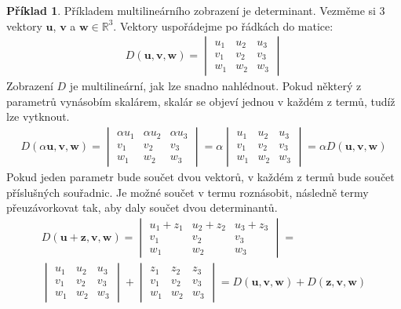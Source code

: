 \documentclass[a5paper,12pt]{amsbook}
\theoremstyle{definition}
\newtheorem{example}{Příklad}[chapter]
\newcommand{\myscalar}[1]{#1}
\newcommand{\myvec}[1]{\mathbf{#1}}
\newcommand{\myspace}[1]{\mathbb{#1}}
\begin{document}
\begin{example}
Příkladem multilineárního zobrazení je determinant. Vezměme si 3 vektory $\myvec{u}$, 
$\myvec{v}$ a $\myvec{w}\in\myspace{R}^3$. Vektory uspořádejme po řádkách do matice:
\begin{align*}
D(\myvec{u}, \myvec{v}, \myvec{w}) =
\begin{vmatrix}
u_1 & u_2 & u_3 \\
v_1 & v_2 & v_3 \\
w_1 & w_2 & w_3
\end{vmatrix}
\end{align*}
Zobrazení $D$ je multilineární, jak lze snadno nahlédnout. Pokud některý z parametrů
vynásobím skalárem, skalár se objeví jednou v každém z termů, tudíž lze vytknout.
\begin{align*}
D(\myscalar{\alpha}\myvec{u}, \myvec{v}, \myvec{w}) =
\begin{vmatrix}
\myscalar{\alpha}u_1 & \myscalar{\alpha}u_2 & \myscalar{\alpha}u_3 \\
v_1 & v_2 & v_3 \\
w_1 & w_2 & w_3
\end{vmatrix}
=
\myscalar{\alpha}
\begin{vmatrix}
u_1 & u_2 & u_3 \\
v_1 & v_2 & v_3 \\
w_1 & w_2 & w_3
\end{vmatrix}
= \myscalar{\alpha}D(\myvec{u}, \myvec{v}, \myvec{w})
\end{align*}
Pokud jeden parametr bude součet dvou vektorů, v každém z termů bude součet příslušných
souřadnic. Je možné součet v termu roznásobit, následně termy přeuzávorkovat tak,
aby daly součet dvou determinantů.
\begin{align*}
D(\myvec{u} + \myvec{z}, \myvec{v}, \myvec{w}) =
\begin{vmatrix}
u_1 + z_1 & u_2 + z_2 & u_3 + z_3 \\
v_1 & v_2 & v_3 \\
w_1 & w_2 & w_3
\end{vmatrix}
= \\
\begin{vmatrix}
u_1 & u_2 & u_3 \\
v_1 & v_2 & v_3 \\
w_1 & w_2 & w_3
\end{vmatrix}
+
\begin{vmatrix}
z_1 & z_2 & z_3 \\
v_1 & v_2 & v_3 \\
w_1 & w_2 & w_3
\end{vmatrix}
= D(\myvec{u}, \myvec{v}, \myvec{w}) + D(\myvec{z}, \myvec{v}, \myvec{w})
\end{align*}
\end{example}
\end{document}
